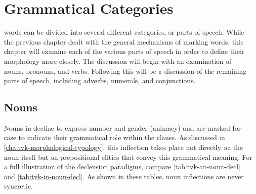 \chapter{Grammatical Categories}
\label{cha:tvk-grammatical-categories}

\langtvk{} words can be divided into several different categories, or parts of speech. While the previous chapter dealt with the general mechanisms of marking words, this chapter will examine each of the various parts of speech in order to define their morphology more closely. The discussion will begin with an examination of nouns, pronouns, and verbs. Following this will be a discussion of the remaining parts of speech, including adverbs, numerals, and conjunctions.

\section{Nouns}
\label{sec:tvk-nouns}

Nouns in \langtvk{} decline to express number and gender (animacy) and are marked for case to indicate their grammatical role within the clause. As discussed in \autoref{cha:tvk-morphological-typology}, this inflection takes place not directly on the noun itself but on prepositional clitics that convey this grammatical meaning\autocite{wals-51}. For a full illustration of the declension paradigms, compare \autoref{tab:tvk-an-noun-decl} and \autoref{tab:tvk-in-noun-decl}. As shown in these tables, \langtvk{} noun inflections are never syncretic\autocite{wals-28}.

